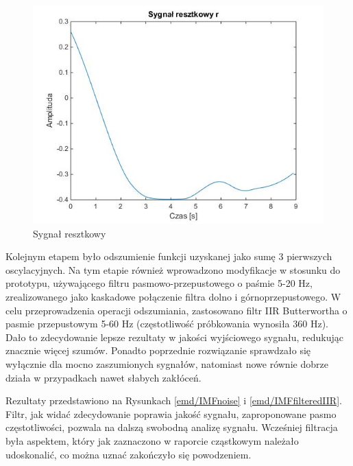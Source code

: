 \documentclass[a4paper]{article}
\begin{document}
\begin{figure}[H]
\centering
\includegraphics[scale=0.6]{emd/residue}
\caption{\label{emd/residue} Sygnał resztkowy}
\end{figure}


Kolejnym etapem było odszumienie funkcji uzyskanej jako sumę 3 pierwszych oscylacyjnych. Na tym etapie również wprowadzono modyfikacje w stosunku do prototypu, używającego filtru pasmowo-przepustowego o paśmie 5-20 Hz, zrealizowanego jako kaskadowe połączenie filtra dolno i górnoprzepustowego.
W celu przeprowadzenia operacji odszumiania, zastosowano filtr IIR Butterwortha o pasmie przepustowym 5-60 Hz (częstotliwość próbkowania wynosiła 360 Hz). Dało to zdecydowanie lepsze rezultaty w jakości wyjściowego sygnału, redukując znacznie więcej szumów. Ponadto poprzednie rozwiązanie sprawdzało się wyłącznie dla mocno zaszumionych sygnałów, natomiast nowe równie dobrze działa w przypadkach nawet słabych zakłóceń.

Rezultaty przedstawiono na Rysunkach \ref{emd/IMFnoise} i \ref{emd/IMFfilteredIIR}. Filtr, jak widać zdecydowanie poprawia jakość sygnału, zaproponowane pasmo częstotliwości, pozwala na dalszą swobodną analizę sygnału. Wcześniej filtracja była aspektem, który jak zaznaczono w raporcie cząstkowym należało udoskonalić, co można uznać zakończyło się powodzeniem. 
\end{document}
